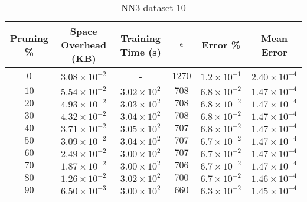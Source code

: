 \begin{adjustwidth}{0cm}{}
\begin{table}
\caption{NN3 dataset 10}\label{pr310}
\begin{tabular}{cccccc}
\hline
\toprule
Pruning \% & Space Overhead (KB) & Training Time (s) & $\epsilon$ & Error \% & Mean Error\\
\midrule
$0$ & $3.08 \times 10^{-2}$ & - & $1270$ & $1.2 \times 10^{-1}$ & $2.40 \times 10^{-4}$\\
$10$ & $5.54 \times 10^{-2}$ & $3.02 \times 10^{2}$ & $708$ & $6.8 \times 10^{-2}$ & $1.47 \times 10^{-4}$\\
$20$ & $4.93 \times 10^{-2}$ & $3.03 \times 10^{2}$ & $708$ & $6.8 \times 10^{-2}$ & $1.47 \times 10^{-4}$\\
$30$ & $4.32 \times 10^{-2}$ & $3.04 \times 10^{2}$ & $708$ & $6.8 \times 10^{-2}$ & $1.47 \times 10^{-4}$\\
$40$ & $3.71 \times 10^{-2}$ & $3.05 \times 10^{2}$ & $707$ & $6.8 \times 10^{-2}$ & $1.47 \times 10^{-4}$\\
$50$ & $3.09 \times 10^{-2}$ & $3.04 \times 10^{2}$ & $707$ & $6.7 \times 10^{-2}$ & $1.47 \times 10^{-4}$\\
$60$ & $2.49 \times 10^{-2}$ & $3.00 \times 10^{2}$ & $707$ & $6.7 \times 10^{-2}$ & $1.47 \times 10^{-4}$\\
$70$ & $1.87 \times 10^{-2}$ & $3.00 \times 10^{2}$ & $706$ & $6.7 \times 10^{-2}$ & $1.47 \times 10^{-4}$\\
$80$ & $1.26 \times 10^{-2}$ & $3.02 \times 10^{2}$ & $700$ & $6.7 \times 10^{-2}$ & $1.46 \times 10^{-4}$\\
$90$ & $6.50 \times 10^{-3}$ & $3.00 \times 10^{2}$ & $660$ & $6.3 \times 10^{-2}$ & $1.45 \times 10^{-4}$\\
\bottomrule
\end{tabular}
\end{table}
\end{adjustwidth}